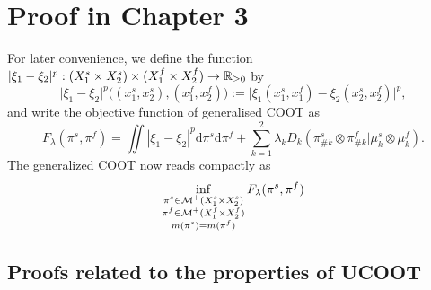 \section{Proof in Chapter 3}

For later convenience, we define the function
$\vert \xi_1 - \xi_2 \vert^p: (X_1^s \times X_2^s) \times (X_1^f \times X_2^f) \to \mathbb R_{\geq 0}$ by
\begin{equation}
    \vert \xi_1 - \xi_2 \vert^p \big((x_1^s, x_2^s), (x_1^f, x_2^f)\big) :=
    \vert \xi_1(x_1^s, x_1^f) - \xi_2(x_2^s, x_2^f) \vert^p,
\end{equation}
and write the objective function of generalised COOT as
\begin{equation}
    F_{\lambda}(\pi^s, \pi^f) = \iint |\xi_1 - \xi_2|^p \mathrm d\pi^s \mathrm d \pi^f
    + \sum_{k=1}^2\lambda_k D_k(\pi^s_{\#k} \otimes \pi^f_{\#k} \vert \mu^s_k \otimes \mu^f_k).
\end{equation}
The generalized COOT now reads compactly as
\begin{equation} \label{eq:ucoot_copy}
  \inf_{\substack{\pi^s \in \mathcal M^+(X_1^s \times X_2^s) \\
  \pi^f \in \mathcal M^+(X_1^f \times X_2^f) \\ m(\pi^s) = m(\pi^f)}} F_{\lambda}(\pi^s, \pi^f)
\end{equation}

\subsection{Proofs related to the properties of UCOOT}

